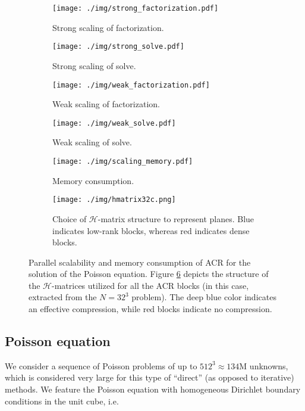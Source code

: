 \documentclass[]{elsarticle}
\begin{document}
\begin{figure}[p]
	\centering
	\begin{subfigure}{.4\textwidth}
		\centering
		\texttt{[image: ./img/strong\_factorization.pdf]}
		\caption{Strong scaling of factorization.}
		\label{fig:pois1}
	\end{subfigure}
	\begin{subfigure}{.4\textwidth}
		\centering
		\texttt{[image: ./img/strong\_solve.pdf]}
		\caption{Strong scaling of solve.}
		\label{fig:pois2}
	\end{subfigure}
	\begin{subfigure}{.4\textwidth}
		\centering
		\texttt{[image: ./img/weak\_factorization.pdf]}
		\caption{Weak scaling of factorization.}
		\label{fig:pois3}
	\end{subfigure}
	\begin{subfigure}{.4\textwidth}
		\centering
		\texttt{[image: ./img/weak\_solve.pdf]}
		\caption{Weak scaling of solve.}
		\label{fig:pois4}
	\end{subfigure}
	\begin{subfigure}{.4\textwidth}
		\centering
		\texttt{[image: ./img/scaling\_memory.pdf]}
		\caption{Memory consumption.}
		\label{fig:pois5}
	\end{subfigure}
	\begin{subfigure}{.4\textwidth}
		\centering
		\texttt{[image: ./img/hmatrix32c.png]}
		\caption{Choice of $\mathcal{H}$-matrix structure to represent planes. Blue indicates low-rank blocks, whereas red indicates dense blocks.}
		\label{fig:pois6}
	\end{subfigure}
\caption{Parallel scalability and memory consumption of ACR for the solution of the Poisson equation. Figure \ref{fig:pois6} depicts the structure of the $\mathcal{H}$-matrices utilized for all the ACR blocks (in this case, extracted from the $N=32^3$ problem). The deep blue color indicates an effective compression, while red blocks indicate no compression.}
\label{fig:scalingPois}
\end{figure}

\subsection{Poisson equation}
\label{section:poisson}

We consider a sequence of Poisson problems of up to $512^3 \approx 134$M unknowns, which is considered very large for this type of ``direct'' (as opposed to iterative) methods. We feature the Poisson equation with homogeneous Dirichlet boundary conditions in the unit cube, i.e.
\end{document}
